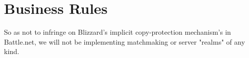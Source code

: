 \section{Business Rules} \label{sec:businessrules}

 
So as not to infringe on Blizzard's implicit copy-protection mechanism's in
Battle.net, we will not be implementing matchmaking or server "realms" of any kind.
